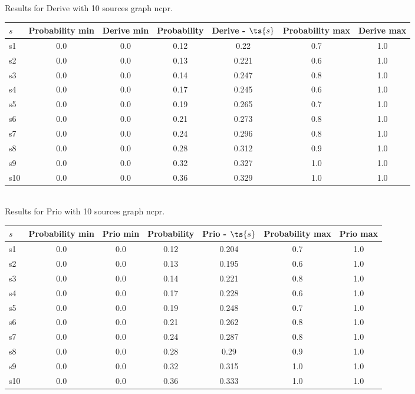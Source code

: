 \documentclass{article}
\begin{document}
\noindent Results for Derive with 10 sources graph ncpr.

\noindent\begin{tabular}{|l|c|c|c|c|c|c|}
\hline
$s$& Probability min & Derive min & Probability & Derive - $\ts{s}$ & Probability max & Derive max\\
\hline
s1 &0.0 & 0.0 & 0.12 & 0.22 & 0.7 & 1.0\\
\hline
s2 &0.0 & 0.0 & 0.13 & 0.221 & 0.6 & 1.0\\
\hline
s3 &0.0 & 0.0 & 0.14 & 0.247 & 0.8 & 1.0\\
\hline
s4 &0.0 & 0.0 & 0.17 & 0.245 & 0.6 & 1.0\\
\hline
s5 &0.0 & 0.0 & 0.19 & 0.265 & 0.7 & 1.0\\
\hline
s6 &0.0 & 0.0 & 0.21 & 0.273 & 0.8 & 1.0\\
\hline
s7 &0.0 & 0.0 & 0.24 & 0.296 & 0.8 & 1.0\\
\hline
s8 &0.0 & 0.0 & 0.28 & 0.312 & 0.9 & 1.0\\
\hline
s9 &0.0 & 0.0 & 0.32 & 0.327 & 1.0 & 1.0\\
\hline
s10 &0.0 & 0.0 & 0.36 & 0.329 & 1.0 & 1.0\\
\hline
\end{tabular}\\

\noindent Results for Prio with 10 sources graph ncpr.

\noindent\begin{tabular}{|l|c|c|c|c|c|c|}
\hline
$s$& Probability min & Prio min & Probability & Prio - $\ts{s}$ & Probability max & Prio max\\
\hline
s1 &0.0 & 0.0 & 0.12 & 0.204 & 0.7 & 1.0\\
\hline
s2 &0.0 & 0.0 & 0.13 & 0.195 & 0.6 & 1.0\\
\hline
s3 &0.0 & 0.0 & 0.14 & 0.221 & 0.8 & 1.0\\
\hline
s4 &0.0 & 0.0 & 0.17 & 0.228 & 0.6 & 1.0\\
\hline
s5 &0.0 & 0.0 & 0.19 & 0.248 & 0.7 & 1.0\\
\hline
s6 &0.0 & 0.0 & 0.21 & 0.262 & 0.8 & 1.0\\
\hline
s7 &0.0 & 0.0 & 0.24 & 0.287 & 0.8 & 1.0\\
\hline
s8 &0.0 & 0.0 & 0.28 & 0.29 & 0.9 & 1.0\\
\hline
s9 &0.0 & 0.0 & 0.32 & 0.315 & 1.0 & 1.0\\
\hline
s10 &0.0 & 0.0 & 0.36 & 0.333 & 1.0 & 1.0\\
\hline
\end{tabular}\\
\end{document}
